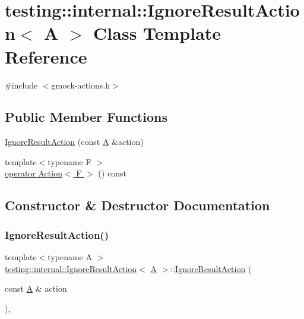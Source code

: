 \hypertarget{classtesting_1_1internal_1_1_ignore_result_action}{}\section{testing\+:\+:internal\+:\+:Ignore\+Result\+Action$<$ A $>$ Class Template Reference}
\label{classtesting_1_1internal_1_1_ignore_result_action}


{\ttfamily \#include $<$gmock-\/actions.\+h$>$}

\subsection*{Public Member Functions}
\begin{DoxyCompactItemize}
\item 
\hyperlink{classtesting_1_1internal_1_1_ignore_result_action_a9199f7b1b7771b2e2a5fd28caf624623}{Ignore\+Result\+Action} (const \hyperlink{namespacetesting_a5e9134d655d2fc9323902348083282e7}{A} \&action)
\item 
{\footnotesize template$<$typename F $>$ }\\\hyperlink{classtesting_1_1internal_1_1_ignore_result_action_affb8b7439604c860e1416f45339c6e37}{operator Action$<$ F $>$} () const
\end{DoxyCompactItemize}


\subsection{Constructor \& Destructor Documentation}
\mbox{\label{classtesting_1_1internal_1_1_ignore_result_action_a9199f7b1b7771b2e2a5fd28caf624623}} 
\subsubsection{\texorpdfstring{Ignore\+Result\+Action()}{IgnoreResultAction()}}
{\footnotesize\ttfamily template$<$typename A $>$ \\
\hyperlink{classtesting_1_1internal_1_1_ignore_result_action}{testing\+::internal\+::\+Ignore\+Result\+Action}$<$ \hyperlink{namespacetesting_a5e9134d655d2fc9323902348083282e7}{A} $>$\+::\hyperlink{classtesting_1_1internal_1_1_ignore_result_action}{Ignore\+Result\+Action} (\begin{DoxyParamCaption}\item[{const \hyperlink{namespacetesting_a5e9134d655d2fc9323902348083282e7}{A} \&}]{action }\end{DoxyParamCaption})\hspace{0.3cm}{\ttfamily [inline]}, {\ttfamily [explicit]}}



